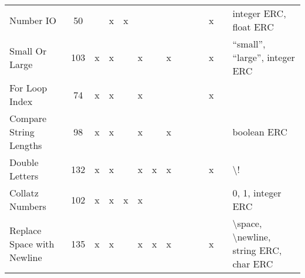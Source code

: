 \documentclass{sig-alternate}
\begin{document}
\begin{table*}
\begin{tabular}{>{\raggedright}p{3.1cm}cccccccccccc>{\raggedright}p{5.5cm}}
\midrule
Number IO                  & 50              &      & x       & x     &         &      &        &                    &                  &                   & x     &            & integer ERC, float ERC                                                                                                                                                                                                      \tabularnewline
Small Or Large             & 103             & x    & x       &       & x       &      & x      &                    &                  &                   & x     &            & ``small'', ``large'', integer ERC                                                                                                                                                                                               \tabularnewline
For Loop Index             & 74              & x    & x       &       & x       &      &        &                    &                  &                   & x     &            &                                                                                                                                                                                                                             \tabularnewline
Compare String Lengths     & 98              & x    & x       &       & x       &      & x      &                    &                  &                   &       &            & boolean ERC                                                                                                                                                                                                                 \tabularnewline
Double Letters             & 132             & x    & x       &       & x       & x    & x      &                    &                  &                   & x     &            & \textbackslash !                                                                                                                                                                                                            \tabularnewline
Collatz Numbers            & 102             & x    & x       & x     & x       &      &        &                    &                  &                   &       &            & 0, 1, integer ERC                                                                                                                                                                                                           \tabularnewline
Replace Space with Newline & 135             & x    & x       &       & x       & x    & x      &                    &                  &                   & x     &            & \textbackslash space, \textbackslash newline, string ERC, char ERC                                                                                                                                                          \tabularnewline

\end{tabular}
\end{table*}
\end{document}

